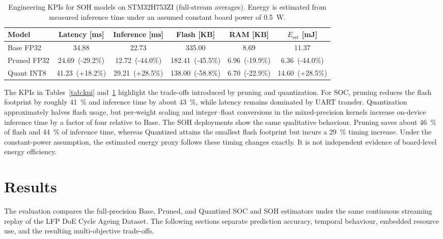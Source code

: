 \documentclass[final,3p,times]{elsarticle}
\begin{document}
  \begin{table}[t!]
      \centering
      \caption{Engineering KPIs for SOH models on STM32H753ZI (full-stream averages). Energy is estimated from measured inference time under an assumed constant board power of \SI{0.5}{\watt}.}
      \label{tab:kpi_soh}
        \begin{tabular}{lccccc}
            \toprule
            Model & Latency [ms] & Inference [ms] & Flash [KB] & RAM [KB] & $E_{\mathrm{est}}$ [mJ] \\
            \midrule
            Base FP32 & 34.88 & 22.73 & 335.00 & 8.69 & 11.37 \\
            Pruned FP32 & 24.69~\textcolor{mgGreen}{(-29.2\%)} & 12.72~\textcolor{mgGreen}{(-44.0\%)} & 182.41~\textcolor{mgGreen}{(-45.5\%)} & 6.96~\textcolor{mgGreen}{(-19.9\%)} & 6.36~\textcolor{mgGreen}{(-44.0\%)} \\
            Quant INT8 & 41.23~\textcolor{mgRed}{(+18.2\%)} & 29.21~\textcolor{mgRed}{(+28.5\%)} & 138.00~\textcolor{mgGreen}{(-58.8\%)} & 6.70~\textcolor{mgGreen}{(-22.9\%)} & 14.60~\textcolor{mgRed}{(+28.5\%)} \\
            \bottomrule
        \end{tabular}
\end{table}

The KPIs in Tables~\ref{tab:kpi} and~\ref{tab:kpi_soh} highlight the trade-offs introduced by pruning and quantization. For SOC, pruning reduces the flash footprint by roughly 41~\% and inference time by about 43~\%, while latency remains dominated by UART transfer. Quantization approximately halves flash usage, but per-weight scaling and integer--float conversions in the mixed-precision kernels increase on-device inference time by a factor of four relative to Base. The SOH deployments show the same qualitative behaviour. Pruning saves about 46~\% of flash and 44~\% of inference time, whereas Quantized attains the smallest flash footprint but incurs a 29~\% timing increase. Under the constant-power assumption, the estimated energy proxy follows these timing changes exactly. It is not independent evidence of board-level energy efficiency.

\section{Results}
\label{sec:results}
The evaluation compares the full-precision Base, Pruned, and Quantized SOC and SOH estimators under the same continuous streaming replay of the LFP DoE Cycle Ageing Dataset. The following sections separate prediction accuracy, temporal behaviour, embedded resource use, and the resulting multi-objective trade-offs.
\end{document}
